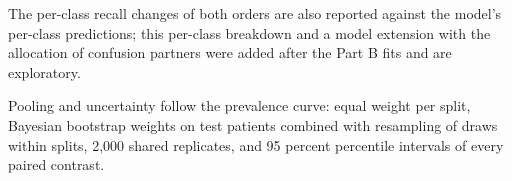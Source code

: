 \documentclass[11pt]{article}
\begin{document}
The per-class recall changes of both orders are also reported against the model's per-class predictions; this per-class breakdown and a model extension with the allocation of confusion partners were added after the Part B fits and are exploratory.

Pooling and uncertainty follow the prevalence curve: equal weight per split, Bayesian bootstrap weights on test patients \citep{rubin1981bayesian} combined with resampling of draws within splits, 2,000 shared replicates, and 95 percent percentile intervals of every paired contrast.





\end{document}

